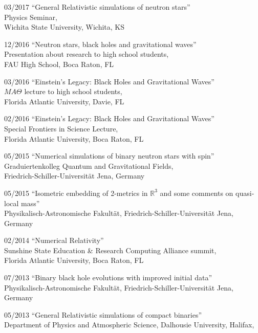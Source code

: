 \documentclass[11pt]{article}
\begin{document}
\begin{list}{}{\leftmargin=5em =1.5em \rightmargin=-8em =7em}
\item[03/2017]	``General Relativistic simulations of neutron stars''\\
		{Physics Seminar}, \\
		{Wichita State University, Wichita, KS}
\item[12/2016]	``Neutron stars, black holes and gravitational waves''\\
		{Presentation about research to high school students}, \\
		{FAU High School, Boca Raton, FL}
\item[03/2016]	``Einstein's Legacy: Black Holes and Gravitational Waves''\\
		{$MA\Theta$ lecture to high school students},\\
		{Florida Atlantic University, Davie, FL}
\item[02/2016]	``Einstein's Legacy: Black Holes and Gravitational Waves''\\
		{Special Frontiers in Science Lecture},\\
		{Florida Atlantic University, Boca Raton, FL}
\item[05/2015]	``Numerical simulations of binary neutron stars with spin''\\
		{Graduiertenkolleg Quantum and Gravitational Fields},\\
		{Friedrich-Schiller-Universit\"at Jena, Germany}
\item[05/2015]	``Isometric embedding of 2-metrics in $\mathbb{R}^3$
		  and some comments on quasi-local mass''\\
		{Physikalisch-Astronomische Fakult\"at},
		{Friedrich-Schiller-Universit\"at Jena, Germany}
\item[02/2014]	``Numerical Relativity''\\
		{Sunshine State Education \& Research Computing Alliance
		summit},\\
		{Florida Atlantic University, Boca Raton, FL}
\item[07/2013]	``Binary black hole evolutions with improved initial data''\\
		{Physikalisch-Astronomische Fakult\"at},
		{Friedrich-Schiller-Universit\"at Jena, Germany}
\item[05/2013]	``General Relativistic simulations of compact binaries''\\
		{Department of Physics and Atmospheric Science},
		{Dalhousie University, Halifax,\\}

\end{list}
\end{document}
